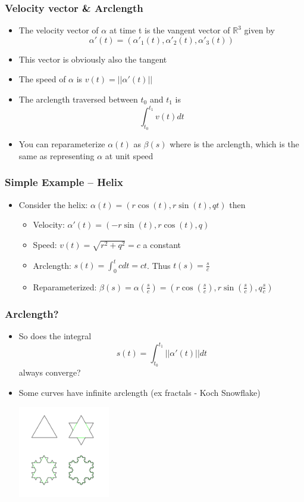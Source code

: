 \documentclass[10pt]{beamer}
\begin{document}
\begin{frame}
  \frametitle{Velocity vector \& Arclength}
  \begin{itemize}
  \item The velocity vector of $\alpha$ at time t is the vangent vector of $\mathbb{R}^3$ given by
    \[ \alpha'(t) = ( \alpha'_1(t), \alpha'_2(t), \alpha'_3(t)) \]
  \item This vector is obviously also the tangent
  \item The speed of $\alpha$ is $v(t) = ||\alpha'(t)||$
  \item The arclength traversed between $t_0$ and $t_1$ is
    \[
      \int_{t_0}^{t_1} v(t) dt
    \]
  \item You can reparameterize $\alpha (t)$ as $\beta (s)$ where is
    the arclength, which is the same as representing $\alpha$ at unit
    speed
  \end{itemize}
\end{frame}

\begin{frame}
  \frametitle{Simple Example --  Helix}
  \begin{itemize}
  \item Consider the helix: $\alpha(t) = ( r \cos(t), r \sin(t), q t )$ then
    \begin{itemize}
    \item Velocity: $\alpha'(t) = ( - r \sin (t), r \cos (t), q)$
    \item Speed: $ v(t) = \sqrt{ r^2 + q^2 } = c$ a constant
    \item Arclength: $s(t) = \int_0^t c dt = ct$. Thus $t(s) = \frac{s}{c}$
    \item Reparameterized: $\beta(s) = \alpha(\frac{s}{c}) = (r \cos (\frac{s}{c}), r \sin(\frac{s}{c}), q \frac{s}{c})$
    \end{itemize}
  \end{itemize}
\end{frame}

\begin{frame}
  \frametitle{Arclength?}
  \begin{itemize}
  \item So does the integral
    \[
      s(t) = \int_{t_0}^{t_1} ||\alpha'(t)|| dt
    \]
    always converge? \pause
  \item Some curves have infinite arclength (ex fractals - Koch Snowflake) 
    \centerline{\includegraphics[height=4cm]{koch-flake}}
  \end{itemize}
\end{frame}
\end{document}
